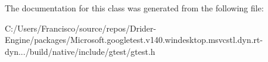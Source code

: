 The documentation for this class was generated from the following file\+:\begin{DoxyCompactItemize}
\item 
C\+:/\+Users/\+Francisco/source/repos/\+Drider-\/\+Engine/packages/\+Microsoft.\+googletest.\+v140.\+windesktop.\+msvcstl.\+dyn.\+rt-\/dyn.../build/native/include/gtest/gtest.\+h\end{DoxyCompactItemize}
